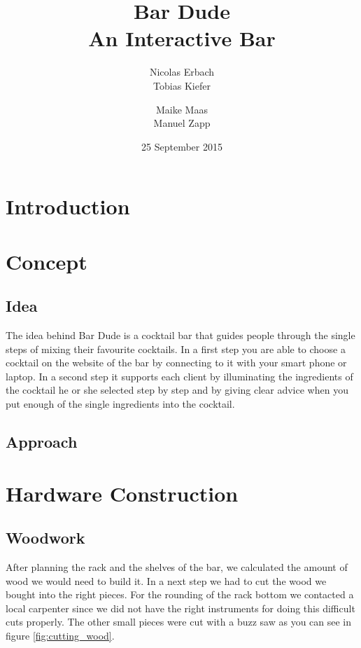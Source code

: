 \documentclass{acm_proc_article-sp}
\begin{document}
\title{Bar Dude \\ An Interactive Bar}
\author{
\alignauthor
Nicolas Erbach\\
\alignauthor
Tobias Kiefer\\
       \and  
\alignauthor Maike Maas\\
\alignauthor Manuel Zapp\\
}
\date{25 September 2015}

\maketitle
\begin{abstract}

\end{abstract}



\section{Introduction}


\section{Concept}
\subsection{Idea}
The idea behind Bar Dude is a cocktail bar that guides people through the single steps of mixing their favourite cocktails. In a first step you are able to choose a cocktail on the website of the bar by connecting to it with your smart phone or laptop. In a second step it supports each client by illuminating the ingredients of the cocktail he or she selected step by step and by giving clear advice when you put enough of the single ingredients into the cocktail.
\subsection{Approach}

\section{Hardware Construction}
\subsection{Woodwork}
After planning the rack and the shelves of the bar, we calculated the amount of wood we would need to build it. In a next step we had to cut the wood we bought into the right pieces. For the rounding of the rack bottom we contacted a local carpenter since we did not have the right instruments for doing this difficult cuts properly. The other small pieces were cut with a buzz saw as you can see in figure \ref{fig:cutting_wood}.
\end{document}
